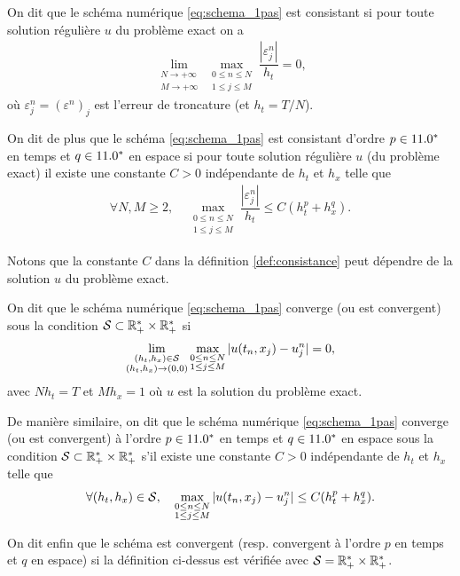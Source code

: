 \documentclass[12pt,a4paper,twoside]{article}
\begin{document}
\begin{definition}[Consistance]
  \label{def:consistance}
  On dit que le sch\'ema num\'erique \eqref{eq:schema_1pas} est consistant si pour toute
  solution r\'eguli\`ere $u$ du probl\`eme exact on a
  \begin{align}
    \lim_{\substack{N \to +\infty\\ M \to +\infty}} \max_{\substack{0\leq n \leq N\\ 1 \leq j \leq M}} 
    \dfrac{| \varepsilon_j^n|}{h_t} = 0 ,
  \end{align}
  o\`u $\varepsilon_j^n = (\varepsilon^n)_j$ est l'erreur de troncature
  (et $h_t = T/N$).

  On dit de plus que le sch\'ema \eqref{eq:schema_1pas} est consistant d'ordre $p \in 11.0^*$
  en temps et $q \in 11.0^*$ en espace si pour toute solution r\'eguli\`ere $u$ (du probl\`eme exact)
  il existe une constante $C>0$ ind\'ependante de $h_t$ et $h_x$ telle que
  \begin{align}
    \forall N, M \geq 2 , \quad \max_{\substack{0\leq n \leq N\\ 1 \leq j \leq M}}
    \dfrac{| \varepsilon_j^n|}{h_t} \leq C (h_t^p + h_x^q) .
  \end{align}
\end{definition}

\begin{remark}
  Notons que la constante $C$ dans la d\'efinition \ref{def:consistance}
  peut d\'ependre de la solution $u$ du probl\`eme exact.
\end{remark}

\begin{definition}[Convergence]
  \label{def:convergence}
  On dit que le sch\'ema num\'erique \eqref{eq:schema_1pas} converge (ou est convergent) 
  sous la condition $\mathcal{S} \subset \mathbb{R}_+^* \times \mathbb{R}_+^*$
  si 
  \begin{align}
    \lim_{\substack{(h_t,h_x) \in \mathcal{S} \\ (h_t,h_x) \to (0,0)}} \max_{\substack{0\leq n \leq N\\ 1 \leq j \leq M}} 
    | u(t_n , x_j) - u_j^n | = 0 ,
  \end{align}
  avec $Nh_t = T$ et $Mh_x = 1$ o\`u $u$ est la solution du probl\`eme exact.
  
  De mani\`ere similaire, on dit que le sch\'ema num\'erique 
  \eqref{eq:schema_1pas} converge (ou est convergent) 
  \`a l'ordre $p\in11.0^*$ en temps et $q\in11.0^*$ en espace
  sous la condition $\mathcal{S} \subset \mathbb{R}_+^* \times \mathbb{R}_+^*$
  s'il existe une constante $C>0$ ind\'ependante de $h_t$ et $h_x$
  telle que
  \begin{align}
    \forall (h_t , h_x) \in \mathcal{S} , \quad \max_{\substack{0\leq n \leq N\\ 1 \leq j \leq M}}
    | u(t_n,x_j) - u_j^n | \leq C (h_t^p + h_x^q) .
  \end{align}

  On dit enfin que le sch\'ema est convergent (resp. convergent \`a l'ordre $p$
  en temps et $q$ en espace) si la d\'efinition ci-dessus est v\'erifi\'ee
  avec $\mathcal{S} = \mathbb{R}_+^* \times \mathbb{R}_+^*$.
\end{definition}
\end{document}
